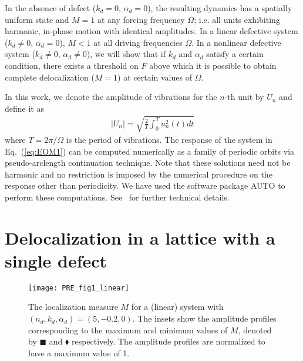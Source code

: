 \documentclass[aps,pre,twocolumn,groupedaddress]{revtex4-1}
\begin{document}
In the absence of defect ($k_d = 0,\,\alpha_d=0$), the resulting dynamics has a spatially uniform state and $M=1$ at any forcing frequency $\Omega$; i.e. all units exhibiting harmonic, in-phase motion with identical amplitudes. In a linear defective system ($k_d \ne 0,\,\alpha_d=0$), $M<1$ at all driving frequencies $\Omega$. In a nonlinear defective system ($k_d \ne 0,\,\alpha_d \ne0$), we will show that if $k_d$ and $\alpha_d$ satisfy a certain condition, there exists a threshold on $F$ above which it is possible to obtain complete delocalization ($M=1$) at certain values of $\Omega$. 


In this work, we denote the amplitude of vibrations for the $n$-th unit by $U_n$ and define it as 
\begin{eqnarray}
	\label{eq:Un}
	|U_n| = \sqrt{ \frac{2}{T} \int_0^T u_n^2(t) dt }
\end{eqnarray}
where $T=2\pi/\Omega$ is the period of vibrations. %
The response of the system in Eq.~(\ref{eq:EOM1}) can be computed numerically as a family of periodic orbits via pseudo-arclength continuation technique. {\color{black}Note that these solutions need not be harmonic and no restriction is imposed by the numerical procedure on the response other than periodicity.} We have used the software package AUTO to perform these computations. See~\cite{continuation_redBook,doedel} for further technical details. 















\section{Delocalization in a lattice with a single defect}
\label{sec:numerics}

\begin{figure}[bt]
	\texttt{[image: PRE\_fig1\_linear]}%
	\caption{
		\label{fig1} 
		The localization measure $M$ for a (linear) system with $(n_d,k_d,\alpha_d)=(5,-0.2,0)$. The insets show the amplitude profiles corresponding to the maximum and minimum values of $M$, denoted by $\blacksquare$ and $\blacklozenge$ respectively. The amplitude profiles are normalized to have a maximum value of 1. 
	}
\end{figure}
\end{document}
